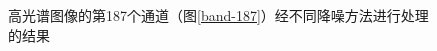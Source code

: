 \documentclass[12pt, a4paper]{article}
\begin{document}
\begin{figure}[htbp]
\caption{高光谱图像的第187个通道（图\ref{band-187}）经不同降噪方法进行处理的结果}
\label{bands-187}
\end{figure}
	
\end{document}
